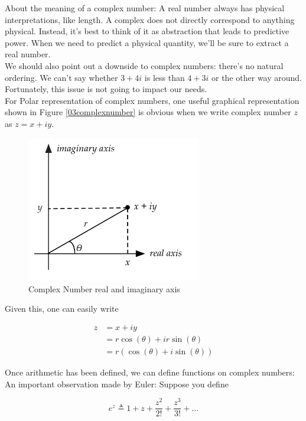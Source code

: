 \documentclass[main.tex]{subfiles}
\begin{document}
    About the meaning of a complex number: A real number always has physical interpretations, like length. A complex does not directly correspond to anything physical. Instead, it's best to think of it as abstraction that leads to predictive power. When we need to predict a physical quantity, we'll be sure to extract a real number.\\
    
    We should also point out a downside to complex numbers: there's no natural ordering. We can't say whether $3+4 i$ is less than $4+3 i$ or the other way around. Fortunately, this issue is not going to impact our needs.\\

    For Polar representation of complex numbers, one useful graphical representation shown in Figure \ref{03complexnumber} is obvious when we write complex number $z$ as $z=x+i y$.\\
    
    \begin{figure}
        \centering
        \includegraphics[width=3in]{notes/figs/n04/03complexnumber.png}
        \caption{Complex Number real and imaginary axis}
        \label{fig:03complexnumber}
    \end{figure}
    
    Given this, one can easily write
    
    \begin{align*}
    z   &=x+i y \\
        &=r \cos (\theta)+i r \sin (\theta) \\
        &=r(\cos (\theta)+i \sin (\theta))
    \end{align*}
    
    Once arithmetic has been defined, we can define functions on complex numbers: An important observation made by Euler: Suppose you define
    
    $$e^{z} \triangleq 1+z+\frac{z^{2}}{2 !}+\frac{z^{3}}{3 !}+\ldots$$
    
\end{document}
